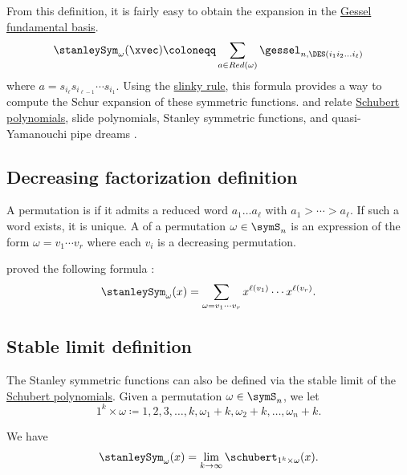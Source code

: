 From this definition, it is fairly easy to obtain the expansion in the
\hyperref[gessel]{Gessel fundamental basis}.
\begin{equation*}
 \stanleySym_\omega(\xvec) \coloneqq \sum_{a \in Red(\omega)} \gessel_{n,\DES(i_1i_2 \dotsc i_\ell)}
\end{equation*}
where $a = s_{i_\ell} s_{i_{\ell-1}}\dotsb s_{i_1}$.
Using the \hyperref[gesselSlinkyRule]{slinky rule}, this formula provides a
way to compute the Schur expansion of these symmetric functions.
 and  relate
\hyperref[schubert]{Schubert polynomials}, slide polynomials, Stanley
symmetric functions, and quasi-Yamanouchi pipe dreams
\cite{AssafSearles2017}.

\subsection[stanleyDecreasingFactorizationDefinition]{Decreasing factorization definition}

A permutation is \label{decreasingPermutation}
if it admits a reduced word $a_1 \dotsc a_\ell$
with $a_1 \gt \dotsb \gt a_{\ell}$. If such a word exists, it is unique.
A \label{decreasingFactorization}
of a permutation $\omega \in \symS_n$ is an expression of the form
$\omega = v_1 \dotsm v_r$ where each $v_i$ is a decreasing permutation.

 proved the following formula \cite{Stanley1984}:
\begin{equation*}
 \stanleySym_\omega(x) = \sum_{\omega = v_1 \dotsm v_r } x^{\ell(v_1)} \dotsm x^{\ell(v_r)}.
\end{equation*}



\subsection[stanleySymLimitDefinition]{Stable limit definition}

The Stanley symmetric functions can also be defined via the stable
limit of the \hyperref[schubert]{Schubert polynomials}.
Given a permutation $\omega \in \symS_n$, we let
\begin{equation*}
1^k \times \omega \coloneqq 1,2,3,\dotsc,k,\omega_1+k,\omega_2+k,\dotsc,\omega_n+k.
\end{equation*}

We have
\begin{equation*}
 \stanleySym_\omega(x) = \lim_{k\to \infty}  \schubert_{1^k \times \omega}(x).
\end{equation*}

